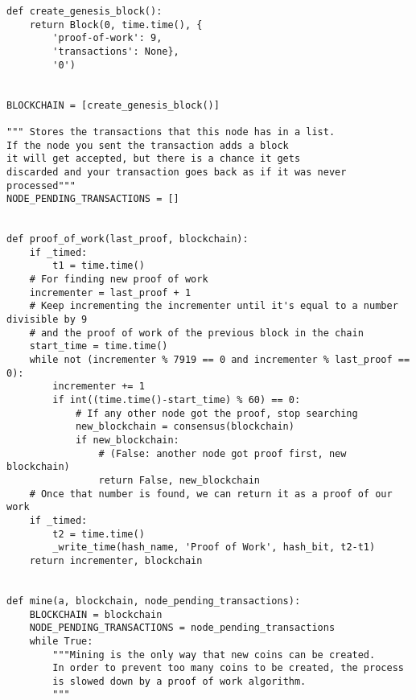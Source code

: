 \begin{lstlisting}
def create_genesis_block():
    return Block(0, time.time(), {
        'proof-of-work': 9,
        'transactions': None},
        '0')


BLOCKCHAIN = [create_genesis_block()]

""" Stores the transactions that this node has in a list.
If the node you sent the transaction adds a block
it will get accepted, but there is a chance it gets
discarded and your transaction goes back as if it was never
processed"""
NODE_PENDING_TRANSACTIONS = []


def proof_of_work(last_proof, blockchain):
    if _timed:
        t1 = time.time()
    # For finding new proof of work
    incrementer = last_proof + 1
    # Keep incrementing the incrementer until it's equal to a number divisible by 9
    # and the proof of work of the previous block in the chain
    start_time = time.time()
    while not (incrementer % 7919 == 0 and incrementer % last_proof == 0):
        incrementer += 1
        if int((time.time()-start_time) % 60) == 0:
            # If any other node got the proof, stop searching
            new_blockchain = consensus(blockchain)
            if new_blockchain:
                # (False: another node got proof first, new blockchain)
                return False, new_blockchain
    # Once that number is found, we can return it as a proof of our work
    if _timed:
        t2 = time.time()
        _write_time(hash_name, 'Proof of Work', hash_bit, t2-t1)
    return incrementer, blockchain


def mine(a, blockchain, node_pending_transactions):
    BLOCKCHAIN = blockchain
    NODE_PENDING_TRANSACTIONS = node_pending_transactions
    while True:
        """Mining is the only way that new coins can be created.
        In order to prevent too many coins to be created, the process
        is slowed down by a proof of work algorithm.
        """


\end{lstlisting}
